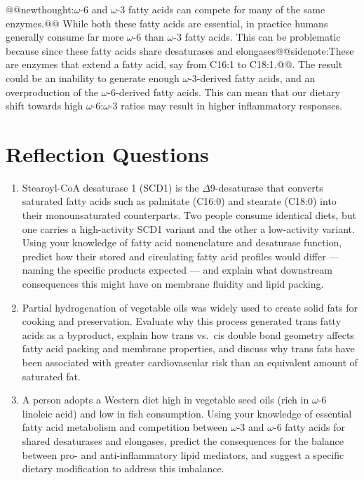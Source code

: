 \documentclass{tufte-handout}
\makeatletter
\def\newthought#1{@@newthought:#1@@}
\def\sidenote#1{@@sidenote:#1@@}
\makeatother
\begin{document}
\newthought{$\omega$-6 and $\omega$-3 fatty acids can compete for many of the same enzymes.}  While both these fatty acids are essential, in practice humans generally consume far more $\omega$-6  than $\omega$-3 fatty acids.  This can be problematic because since these fatty acids share desaturases and elongases\sidenote{These are enzymes that extend a fatty acid, say from C16:1 to C18:1.}.  The result could be an inability to generate enough $\omega$-3-derived fatty acids, and an overproduction of the $\omega$-6-derived fatty acids.  This can mean that our dietary shift towards high $\omega$-6:$\omega$-3 ratios may result in higher inflammatory responses.

\section{Reflection Questions}
\begin{enumerate}
\item Stearoyl-CoA desaturase 1 (SCD1) is the $\Delta$9-desaturase that converts saturated fatty acids such as palmitate (C16:0) and stearate (C18:0) into their monounsaturated counterparts. Two people consume identical diets, but one carries a high-activity SCD1 variant and the other a low-activity variant. Using your knowledge of fatty acid nomenclature and desaturase function, predict how their stored and circulating fatty acid profiles would differ --- naming the specific products expected --- and explain what downstream consequences this might have on membrane fluidity and lipid packing.
\item Partial hydrogenation of vegetable oils was widely used to create solid fats for cooking and preservation. Evaluate why this process generated trans fatty acids as a byproduct, explain how trans vs.\ cis double bond geometry affects fatty acid packing and membrane properties, and discuss why trans fats have been associated with greater cardiovascular risk than an equivalent amount of saturated fat.
\item A person adopts a Western diet high in vegetable seed oils (rich in $\omega$-6 linoleic acid) and low in fish consumption. Using your knowledge of essential fatty acid metabolism and competition between $\omega$-3 and $\omega$-6 fatty acids for shared desaturases and elongases, predict the consequences for the balance between pro- and anti-inflammatory lipid mediators, and suggest a specific dietary modification to address this imbalance.
\end{enumerate}



\end{document}
